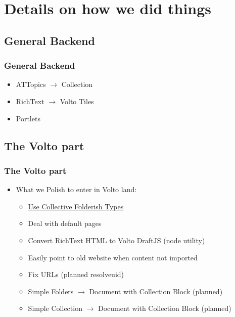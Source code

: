 \documentclass[aspectratio=169]{beamer}
\begin{document}
\section{Details on how we did things}
\subsection{General Backend}
\begin{frame}
  \frametitle{General Backend}
  \begin{itemize}
    \item ATTopics $\rightarrow$ Collection \pause
    \item RichText $\rightarrow$ Volto Tiles \pause
    \item Portlets
  \end{itemize}
\end{frame}

\subsection{The Volto part}
\begin{frame}
  \frametitle{The Volto part}
  \begin{itemize}
    \item What we Polish to enter in Volto land:
    \begin{itemize}
      \item \href{https://github.com/collective/collective.folderishtypes}{Use Collective Folderish Types} \pause
      \item Deal with default pages \pause
      \item Convert RichText HTML to Volto DraftJS (node utility) \pause
      \item Easily point to old website when content not imported \pause
      \item Fix URLs (planned resolveuid) \pause
      \item Simple Folders $\rightarrow$ Document with Collection Block (planned) \pause
      \item Simple Collection $\rightarrow$ Document with Collection Block (planned)
    \end{itemize}
  \end{itemize}
\end{frame}

\end{document}
